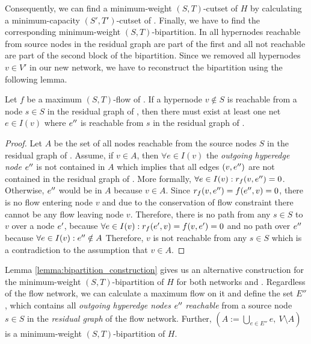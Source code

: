 Consequently, we can find a minimum-weight $(S,T)$-cutset of $H$ by calculating
a minimum-capacity $(S',T')$-cutset of . Finally, we have to find the 
corresponding minimum-weight $(S,T)$-bipartition. In  all hypernodes
reachable from source nodes in the residual graph are part of the first and 
all not reachable are part of the second block of the bipartition. Since we removed 
all hypernodes $v \in V'$ in our new network, we have to reconstruct the bipartition
using the following lemma.

\begin{lemma}
\label{lemma:bipartition_construction}
Let $f$ be a maximum $(S,T)$-flow of . If a hypernode $v \notin S$ is reachable
from a node $s \in S$ in the residual graph of , then there must exist at least one
net $e \in I(v)$ where $e''$ is reachable from $s$ in the residual graph of .
\end{lemma}

\begin{proof}
Let $A$ be the set of all nodes reachable from the source nodes $S$ in the residual graph of .
Assume, if $v \in A$, then $\forall e \in I(v)$ the \emph{outgoing hyperedge node} $e''$
is not contained in $A$ which implies that all edges $(v,e'')$ are not contained in
the residual graph of . More formally, $\forall e \in I(v): r_f(v,e'') = 0$. 
Otherwise, $e''$ would be in $A$ because $v \in A$. 
Since $r_f(v,e'') = f(e'',v) = 0$, there is no flow entering node 
$v$ and due to the conservation of flow constraint there cannot be any 
flow leaving node $v$. Therefore, there is no path
from any $s \in S$ to $v$ over a node $e'$, because $\forall e \in I(v): r_f(e',v) = f(v,e') = 0$ and no path over $e''$ because $\forall e \in I(v): e'' \notin A$
Therefore, $v$ is not reachable from any $s \in S$ which is a contradiction
to the assumption that $v \in A$.
\end{proof}

Lemma \ref{lemma:bipartition_construction} gives us an alternative construction for the minimum-weight $(S,T)$-bipartition
of $H$ for both networks  and . Regardless of the flow network, we can 
calculate a maximum flow on it and define the set $E''$, which contains all \emph{outgoing hyperedge
nodes} $e''$ \emph{reachable} from a source node $s \in S$ in the \emph{residual graph} of the flow network. 
Further, $(A := \bigcup_{e \in E''} e,\ V\setminus A)$ is a 
minimum-weight $(S,T)$-bipartition of $H$.


